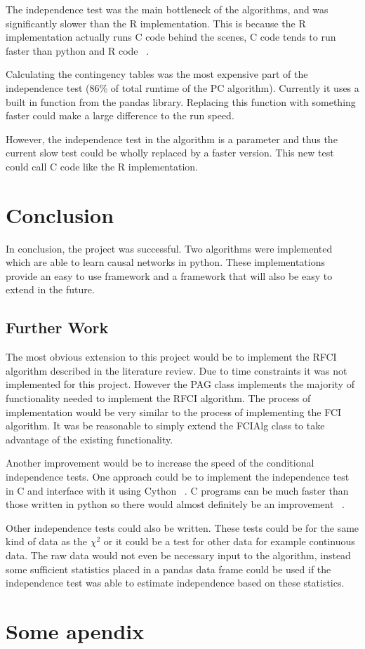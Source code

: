 \documentclass{UoYCSproject}
\begin{document}
The independence test was the main bottleneck of the algorithms, and was significantly slower than the R implementation. This is because the R implementation actually runs C code behind the scenes, C code tends to run faster than python and R code ~\parencite{wilbers2009using, wilkinson_2014}.

Calculating the contingency tables was the most expensive part of the independence test (86\% of total runtime of the PC algorithm). Currently it uses a built in function from the pandas library. Replacing this function with something faster could make a large difference to the run speed.

However, the independence test in the algorithm is a parameter and thus the current slow test could be wholly replaced by a faster version. This new test could call C code like the R implementation.

\chapter{Conclusion}
In conclusion, the project was successful. Two algorithms were implemented which are able to learn causal networks in python. These implementations provide an easy to use framework and a framework that will also be easy to extend in the future.

\section{Further Work}
The most obvious extension to this project would be to implement the RFCI algorithm described in the literature review. Due to time constraints it was not implemented for this project. However the PAG class implements the majority of functionality needed to implement the RFCI algorithm. The process of implementation would be very similar to the process of implementing the FCI algorithm. It was be reasonable to simply extend the FCIAlg class to take advantage of the existing functionality.

Another improvement would be to increase the speed of the conditional independence tests. One approach could be to implement the independence test in C and interface with it using Cython ~\parencite{cython}. C programs can be much faster than those written in python so there would almost definitely be an improvement ~\parencite{wilbers2009using}.

Other independence tests could also be written. These tests could be for the same kind of data as the $\chi^2$ or it could be a test for other data for example continuous data. The raw data would not even be necessary input to the algorithm, instead some sufficient statistics placed in a pandas data frame could be used if the independence test was able to estimate independence based on these statistics.

\appendix
\chapter{Some apendix}
\printbibliography
\end{document}
